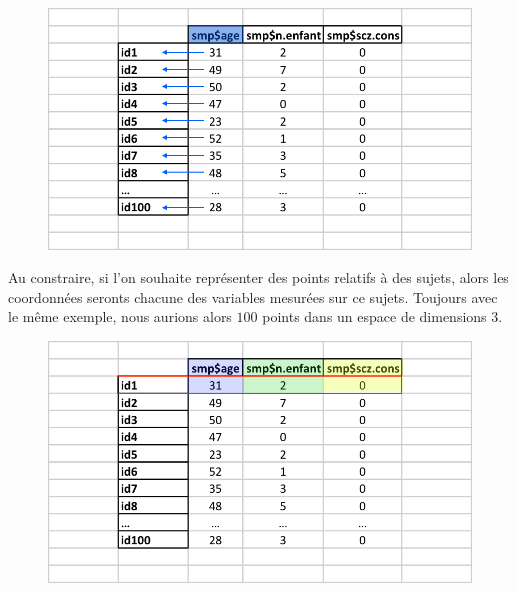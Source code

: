\begin{figure}[H]\begin{center}\includegraphics[scale=0.5]{ilu/ClassHierarConstrucTAB1.png}\end{center}\end{figure}

Au constraire, si l'on souhaite représenter des points relatifs à des sujets, alors les coordonnées seronts chacune des variables mesurées sur ce sujets. Toujours avec le même exemple, nous aurions alors $100$ points dans un espace de dimensions $3$.

\begin{figure}[H]\begin{center}\includegraphics[scale=0.5]{ilu/ClassHierarConstrucTAB2.png}\end{center}\end{figure}

